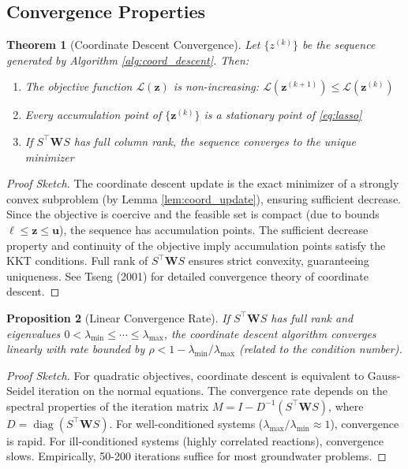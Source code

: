 \documentclass[12pt,a4paper]{article}
\theoremstyle{plain}
\newtheorem{theorem}{Theorem}[section]
\newtheorem{proposition}[theorem]{Proposition}
\theoremstyle{definition}
\theoremstyle{remark}
\DeclareMathOperator{\diag}{diag}
\begin{document}
\subsection{Convergence Properties}

\begin{theorem}[Coordinate Descent Convergence]\label{thm:cd_convergence}
	Let $\{z^{(k)}\}$ be the sequence generated by Algorithm \ref{alg:coord_descent}. Then:
	\begin{enumerate}
		\item The objective function $\mathcal{L}(\mathbf{z})$ is non-increasing: $\mathcal{L}(\mathbf{z}^{(k+1)}) \leq \mathcal{L}(\mathbf{z}^{(k)})$
		\item Every accumulation point of $\{\mathbf{z}^{(k)}\}$ is a stationary point of \eqref{eq:lasso}
		\item If $S^\top \mathbf{W} S$ has full column rank, the sequence converges to the unique minimizer
	\end{enumerate}
\end{theorem}

\begin{proof}[Proof Sketch]
	The coordinate descent update is the exact minimizer of a strongly convex subproblem (by Lemma \ref{lem:coord_update}), ensuring sufficient decrease. Since the objective is coercive and the feasible set is compact (due to bounds $\boldsymbol{\ell} \leq \mathbf{z} \leq \mathbf{u}$), the sequence has accumulation points. The sufficient decrease property and continuity of the objective imply accumulation points satisfy the KKT conditions. Full rank of $S^\top \mathbf{W} S$ ensures strict convexity, guaranteeing uniqueness. See Tseng (2001) for detailed convergence theory of coordinate descent.
\end{proof}

\begin{proposition}[Linear Convergence Rate]\label{prop:linear_convergence}
	If $S^\top \mathbf{W} S$ has full rank and eigenvalues $0 < \lambda_{\min} \leq \cdots \leq \lambda_{\max}$, the coordinate descent algorithm converges linearly with rate bounded by $\rho < 1 - \lambda_{\min}/\lambda_{\max}$ (related to the condition number).
\end{proposition}

\begin{proof}[Proof Sketch]
	For quadratic objectives, coordinate descent is equivalent to Gauss-Seidel iteration on the normal equations. The convergence rate depends on the spectral properties of the iteration matrix $M = I - D^{-1}(S^\top \mathbf{W} S)$, where $D = \diag(S^\top \mathbf{W} S)$. For well-conditioned systems ($\lambda_{\max}/\lambda_{\min} \approx 1$), convergence is rapid. For ill-conditioned systems (highly correlated reactions), convergence slows. Empirically, 50-200 iterations suffice for most groundwater problems.
\end{proof}
\end{document}
